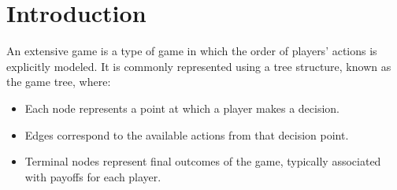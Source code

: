 \section{Introduction}

An extensive game is a type of game in which the order of players' actions is explicitly modeled. 
It is commonly represented using a tree structure, known as the game tree, where:
\begin{itemize}
    \item Each node represents a point at which a player makes a decision.
    \item Edges correspond to the available actions from that decision point.
    \item Terminal nodes represent final outcomes of the game, typically associated with payoffs for each player.
\end{itemize}